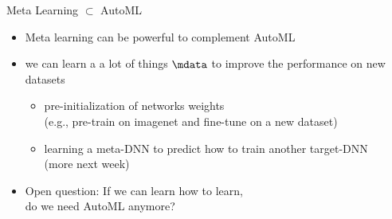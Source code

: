 \begin{frame}[c]{Meta Learning $\subset$ AutoML}

\begin{itemize}
	\item Meta learning can be powerful to complement AutoML
	\pause
	\medskip
	\item we can learn a a lot of things $\mdata$ to improve the performance on new datasets
	\begin{itemize}
		\item pre-initialization of networks weights\\
		(e.g., pre-train on imagenet and fine-tune on a new dataset)
		\item learning a meta-DNN to predict how to train another target-DNN\\
		(more next week)
	\end{itemize}
	\pause
	\medskip
	\item Open question: If we can learn how to learn,\\ do we need AutoML anymore?
\end{itemize}

\end{frame}
